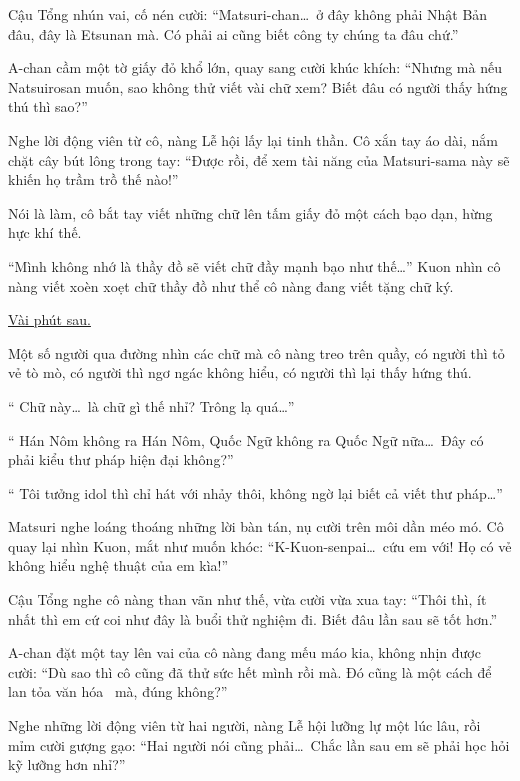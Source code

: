 \documentclass[../main.tex]{subfiles}
\begin{document}
Cậu Tổng nhún vai, cố nén cười: ``Matsuri-chan\dots\ ở đây không phải Nhật Bản đâu, đây là Etsunan mà. Có phải ai cũng biết công ty chúng ta đâu chứ.''

A-chan cầm một tờ giấy đỏ khổ lớn, quay sang cười khúc khích: ``Nhưng mà nếu Natsuirosan muốn, sao không thử viết vài chữ xem? Biết đâu có người thấy hứng thú thì sao?''

Nghe lời động viên từ cô, nàng Lễ hội lấy lại tinh thần. Cô xắn tay áo dài, nắm chặt cây bút lông trong tay: ``Được rồi, để xem tài năng của Matsuri-sama này sẽ khiến họ trầm trồ thế nào!''

Nói là làm, cô bắt tay viết những chữ lên tấm giấy đỏ một cách bạo dạn, hừng hực khí thế.

``Mình không nhớ là thầy đồ sẽ viết chữ đầy mạnh bạo như thế\dots'' Kuon nhìn cô nàng viết xoèn xoẹt chữ thầy đồ như thể cô nàng đang viết tặng chữ ký.

\begin{center}
    \uline{Vài phút sau.}
\end{center}
Một số người qua đường nhìn các chữ mà cô nàng treo trên quầy, có người thì tỏ vẻ tò mò, có người thì ngơ ngác không hiểu, có người thì lại thấy hứng thú.

``{\color{red} Chữ này\dots\ là chữ gì thế nhỉ? Trông lạ quá\dots}''

``{\color{red} Hán Nôm không ra Hán Nôm, Quốc Ngữ không ra Quốc Ngữ nữa\dots\ Đây có phải kiểu thư pháp hiện đại không?}''

``{\color{red} Tôi tưởng idol thì chỉ hát với nhảy thôi, không ngờ lại biết cả viết thư pháp\dots}''

Matsuri nghe loáng thoáng những lời bàn tán, nụ cười trên môi dần méo mó. Cô quay lại nhìn Kuon, mắt như muốn khóc: ``K-Kuon-senpai\dots\ cứu em với! Họ có vẻ không hiểu nghệ thuật của em kìa!''

Cậu Tổng nghe cô nàng than vãn như thế, vừa cười vừa xua tay: ``Thôi thì, ít nhất thì em cứ coi như đây là buổi thử nghiệm đi. Biết đâu lần sau sẽ tốt hơn.''

A-chan đặt một tay lên vai của cô nàng đang mếu máo kia, không nhịn được cười: ``Dù sao thì cô cũng đã thử sức hết mình rồi mà. Đó cũng là một cách để lan tỏa văn hóa \hll\ mà, đúng không?''

Nghe những lời động viên từ hai người, nàng Lễ hội lưỡng lự một lúc lâu, rồi mỉm cười gượng gạo: ``Hai người nói cũng phải\dots\ Chắc lần sau em sẽ phải học hỏi kỹ lưỡng hơn nhỉ?''

\ct
\end{document}
